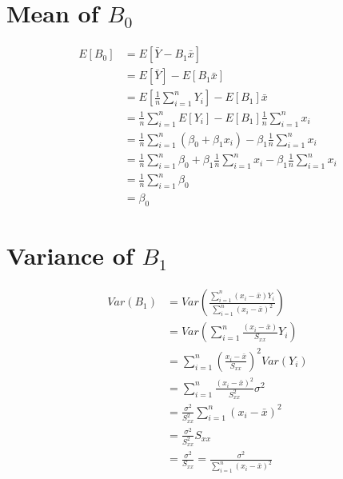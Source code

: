 \documentclass{article}
\begin{document}
\section*{Mean of $B_0$}
\begin{align*}
    E[B_0] & = E[\bar{Y} - B_1 \bar{x}]                                                                                        \\
           & = E[\bar{Y}] - E[B_1 \bar{x}]                                                                                     \\
           & = E\left[\frac{1}{n} \sum_{i=1}^n Y_i\right] - E[B_1] \bar{x}                                                     \\
           & = \frac{1}{n} \sum_{i=1}^n E[Y_i] - E[B_1] \frac{1}{n} \sum_{i=1}^n x_i                                           \\
           & = \frac{1}{n} \sum_{i=1}^n (\beta_0 + \beta_1 x_i) - \beta_1 \frac{1}{n} \sum_{i=1}^n x_i                         \\
           & = \frac{1}{n} \sum_{i=1}^n \beta_0  + \beta_1 \frac{1}{n} \sum_{i=1}^n x_i - \beta_1 \frac{1}{n} \sum_{i=1}^n x_i \\
           & = \frac{1}{n} \sum_{i=1}^n \beta_0                                                                                \\
           & = \beta_0
\end{align*}

\section*{Variance of $B_1$}
\begin{align*}
    Var(B_1) & = Var\left( \frac{\sum_{i=1}^n (x_i - \bar{x}) Y_i}{\sum_{i=1}^n (x_i - \bar{x})^2} \right) \\
             & = Var\left( \sum_{i=1}^n \frac{(x_i - \bar{x})}{S_{xx}} Y_i \right)                         \\
             & = \sum_{i=1}^n \left( \frac{x_i - \bar{x}}{S_{xx}} \right)^2 Var(Y_i)                       \\
             & = \sum_{i=1}^n \frac{(x_i - \bar{x})^2}{S_{xx}^2} \sigma^2                                  \\
             & = \frac{\sigma^2}{S_{xx}^2} \sum_{i=1}^n (x_i - \bar{x})^2                                  \\
             & = \frac{\sigma^2}{S_{xx}^2} S_{xx}                                                          \\
             & = \frac{\sigma^2}{S_{xx}} = \frac{\sigma^2}{\sum_{i=1}^n (x_i - \bar{x})^2}                 \\
\end{align*}
\end{document}
